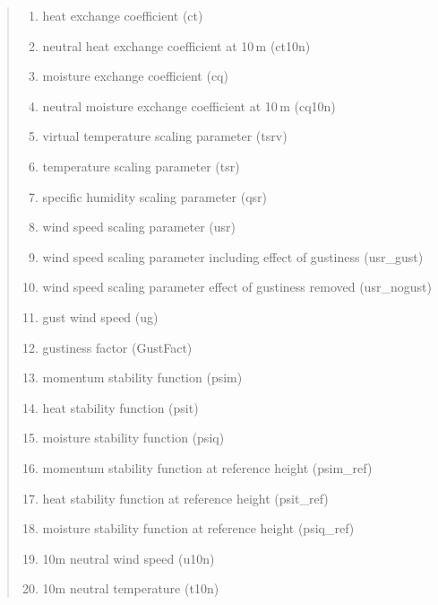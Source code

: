 \documentclass[letterpaper,10pt,english]{sphinxmanual}
\begin{document}
\begin{fulllineitems}
\begin{quote}
\begin{description}
\begin{itemize}
\begin{enumerate}
\item {} 
heat exchange coefficient (ct)

\item {} 
neutral heat exchange coefficient at 10\,m (ct10n)

\item {} 
moisture exchange coefficient (cq)

\item {} 
neutral moisture exchange coefficient at 10\,m (cq10n)

\item {} 
virtual temperature scaling parameter (tsrv)

\item {} 
temperature scaling parameter (tsr)

\item {} 
specific humidity scaling parameter (qsr)

\item {} 
wind speed scaling parameter (usr)

\item {} 
wind speed scaling parameter including effect of gustiness (usr\_gust)

\item {} 
wind speed scaling parameter effect of gustiness removed (usr\_nogust)

\item {} 
gust wind speed (ug)

\item {} 
gustiness factor (GustFact)

\item {} 
momentum stability function (psim)

\item {} 
heat stability function (psit)

\item {} 
moisture stability function (psiq)

\item {} 
momentum stability function at reference height (psim\_ref)

\item {} 
heat stability function at reference height (psit\_ref)

\item {} 
moisture stability function at reference height (psiq\_ref)

\item {} 
10m neutral wind speed (u10n)

\item {} 
10m neutral temperature (t10n)


\end{enumerate}
\end{itemize}
\end{description}
\end{quote}
\end{fulllineitems}
\end{document}
